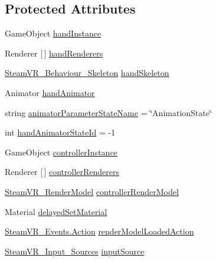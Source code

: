\subsection*{Protected Attributes}
\begin{DoxyCompactItemize}
\item 
Game\+Object \mbox{\hyperlink{class_valve_1_1_v_r_1_1_interaction_system_1_1_render_model_aac7c58dc0bd6b34bd470bf2009aaaba8}{hand\+Instance}}
\item 
Renderer \mbox{[}$\,$\mbox{]} \mbox{\hyperlink{class_valve_1_1_v_r_1_1_interaction_system_1_1_render_model_ae1b10bdf5647c733d0b7757d3ade3049}{hand\+Renderers}}
\item 
\mbox{\hyperlink{class_valve_1_1_v_r_1_1_steam_v_r___behaviour___skeleton}{Steam\+V\+R\+\_\+\+Behaviour\+\_\+\+Skeleton}} \mbox{\hyperlink{class_valve_1_1_v_r_1_1_interaction_system_1_1_render_model_a470bd080ebcbef7ba08468ef3474cb0b}{hand\+Skeleton}}
\item 
Animator \mbox{\hyperlink{class_valve_1_1_v_r_1_1_interaction_system_1_1_render_model_a81fd0293f1e32def07f7f848f4cd42c5}{hand\+Animator}}
\item 
string \mbox{\hyperlink{class_valve_1_1_v_r_1_1_interaction_system_1_1_render_model_a1f89b95a5c57e3b2b947f1339ec2f651}{animator\+Parameter\+State\+Name}} = \char`\"{}Animation\+State\char`\"{}
\item 
int \mbox{\hyperlink{class_valve_1_1_v_r_1_1_interaction_system_1_1_render_model_ada7ee4ba3b7f987468abbe8034a4189d}{hand\+Animator\+State\+Id}} = -\/1
\item 
Game\+Object \mbox{\hyperlink{class_valve_1_1_v_r_1_1_interaction_system_1_1_render_model_abd776c437ed87c27f6d7322465201375}{controller\+Instance}}
\item 
Renderer \mbox{[}$\,$\mbox{]} \mbox{\hyperlink{class_valve_1_1_v_r_1_1_interaction_system_1_1_render_model_a8211cc2f7301cd6838269577715a75ab}{controller\+Renderers}}
\item 
\mbox{\hyperlink{class_valve_1_1_v_r_1_1_steam_v_r___render_model}{Steam\+V\+R\+\_\+\+Render\+Model}} \mbox{\hyperlink{class_valve_1_1_v_r_1_1_interaction_system_1_1_render_model_a44114c82f02800c9075c2229c602c041}{controller\+Render\+Model}}
\item 
Material \mbox{\hyperlink{class_valve_1_1_v_r_1_1_interaction_system_1_1_render_model_aea6706dd25b80e01b3c7a7734b5b970f}{delayed\+Set\+Material}}
\item 
\mbox{\hyperlink{class_valve_1_1_v_r_1_1_steam_v_r___events_1_1_action}{Steam\+V\+R\+\_\+\+Events.\+Action}} \mbox{\hyperlink{class_valve_1_1_v_r_1_1_interaction_system_1_1_render_model_a2339e911cb84e420adc9b610ef320656}{render\+Model\+Loaded\+Action}}
\item 
\mbox{\hyperlink{namespace_valve_1_1_v_r_a82e5bf501cc3aa155444ee3f0662853f}{Steam\+V\+R\+\_\+\+Input\+\_\+\+Sources}} \mbox{\hyperlink{class_valve_1_1_v_r_1_1_interaction_system_1_1_render_model_aa529598fe871f82a801afe6be052300e}{input\+Source}}
\end{DoxyCompactItemize}
